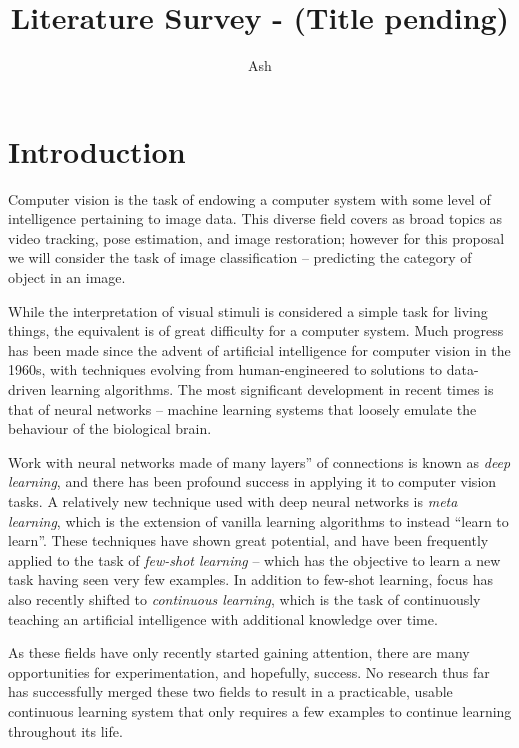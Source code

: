 \documentclass{report}
\title{Literature Survey - (Title pending)}
\author{Ash}
\begin{document}
	\maketitle
	\thispagestyle{empty}
	\newpage
	\thispagestyle{empty}
	\tableofcontents
	\newpage
	\thispagestyle{empty}
	\listoffigures
	\newpage
	
	\chapter{Introduction}

	Computer vision is the task of endowing a computer system with some level of intelligence pertaining to image data. This diverse field covers as broad topics as video tracking, pose estimation, and image restoration; however for this proposal we will consider the task of image classification -- predicting the category of object in an image. \par
	While the interpretation of visual stimuli is considered a simple task for living things, the equivalent is of great difficulty for a computer system. Much progress has been made since the advent of artificial intelligence for computer vision in the 1960s, with techniques evolving from human-engineered to solutions to data-driven learning algorithms. The most significant development in recent times is that of neural networks -- machine learning systems that loosely emulate the behaviour of the biological brain. \par
	Work with neural networks made of many layers'' of connections is known as \emph{deep learning}, and there has been profound success in applying it to computer vision tasks. A relatively new technique used with deep neural networks is \emph{meta learning}, which is the extension of vanilla learning algorithms to instead ``learn to learn''. These techniques have shown great potential, and have been frequently applied to the task of \emph{few-shot learning} -- which has the objective to learn a new task having seen very few examples. In addition to few-shot learning, focus has also recently shifted to \emph{continuous learning}, which is the task of continuously teaching an artificial intelligence with additional knowledge over time. \par
	As these fields have only recently started gaining attention, there are many opportunities for experimentation, and hopefully, success. No research thus far has successfully merged these two fields to result in a practicable, usable continuous learning system that only requires a few examples to continue learning throughout its life. \par
\end{document}
